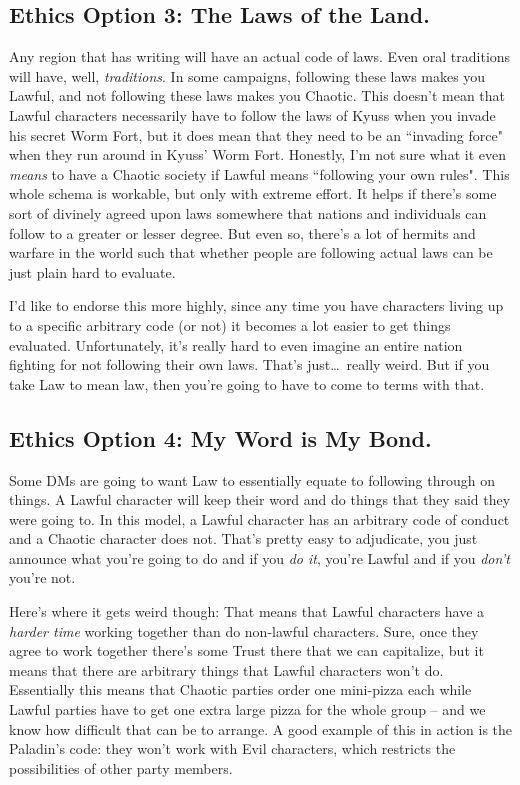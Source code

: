\subsection{Ethics Option 3: The Laws of the Land.}
Any region that has writing will have an actual code of laws. Even oral traditions will have, well, \textit{traditions}. In some campaigns, following these laws makes you Lawful, and not following these laws makes you Chaotic. This doesn't mean that Lawful characters necessarily have to follow the laws of Kyuss when you invade his secret Worm Fort, but it does mean that they need to be an ``invading force" when they run around in Kyuss' Worm Fort. Honestly, I'm not sure what it even \textit{means} to have a Chaotic society if Lawful means ``following your own rules". This whole schema is workable, but only with extreme effort. It helps if there's some sort of divinely agreed upon laws somewhere that nations and individuals can follow to a greater or lesser degree. But even so, there's a lot of hermits and warfare in the world such that whether people are following actual laws can be just plain hard to evaluate.

I'd like to endorse this more highly, since any time you have characters living up to a specific arbitrary code (or not) it becomes a lot easier to get things evaluated. Unfortunately, it's really hard to even imagine an entire nation fighting for not following their own laws. That's just\ldots\  really weird. But if you take Law to mean law, then you're going to have to come to terms with that.

\subsection{Ethics Option 4: My Word is My Bond.}
Some DMs are going to want Law to essentially equate to following through on things. A Lawful character will keep their word and do things that they said they were going to. In this model, a Lawful character has an arbitrary code of conduct and a Chaotic character does not. That's pretty easy to adjudicate, you just announce what you're going to do and if you \textit{do it}, you're Lawful and if you \textit{don't} you're not.

Here's where it gets weird though: That means that Lawful characters have a \textit{harder time} working together than do non-lawful characters. Sure, once they agree to work together there's some Trust there that we can capitalize, but it means that there are arbitrary things that Lawful characters won't do. Essentially this means that Chaotic parties order one mini-pizza each while Lawful parties have to get one extra large pizza for the whole group -- and we know how difficult that can be to arrange. A good example of this in action is the Paladin's code: they won't work with Evil characters, which restricts the possibilities of other party members.

